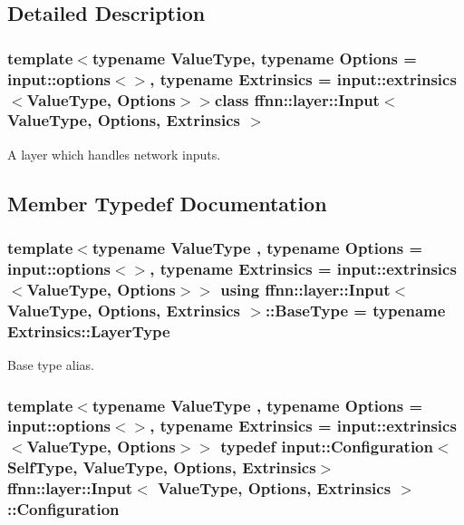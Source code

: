 \subsection{Detailed Description}
\subsubsection*{template$<$typename Value\-Type, typename Options = input\-::options$<$$>$, typename Extrinsics = input\-::extrinsics$<$\-Value\-Type, Options$>$$>$class ffnn\-::layer\-::\-Input$<$ Value\-Type, Options, Extrinsics $>$}

A layer which handles network inputs. 

\subsection{Member Typedef Documentation}
\hypertarget{classffnn_1_1layer_1_1_input_a260554aaf9a0bfddfc4a47b6acf0ecc0}{
\subsubsection[{Base\-Type}]{\setlength{\rightskip}{0pt plus 5cm}template$<$typename Value\-Type , typename Options  = input\-::options$<$$>$, typename Extrinsics  = input\-::extrinsics$<$\-Value\-Type, Options$>$$>$ using {\bf ffnn\-::layer\-::\-Input}$<$ Value\-Type, Options, Extrinsics $>$\-::{\bf Base\-Type} =  typename Extrinsics\-::\-Layer\-Type}}\label{classffnn_1_1layer_1_1_input_a260554aaf9a0bfddfc4a47b6acf0ecc0}


Base type alias. 

\hypertarget{classffnn_1_1layer_1_1_input_ae847a51afe587ae67d9cb1de579d15aa}{
\subsubsection[{Configuration}]{\setlength{\rightskip}{0pt plus 5cm}template$<$typename Value\-Type , typename Options  = input\-::options$<$$>$, typename Extrinsics  = input\-::extrinsics$<$\-Value\-Type, Options$>$$>$ typedef {\bf input\-::\-Configuration}$<${\bf Self\-Type}, Value\-Type, Options, Extrinsics$>$ {\bf ffnn\-::layer\-::\-Input}$<$ Value\-Type, Options, Extrinsics $>$\-::{\bf Configuration}}}\label{classffnn_1_1layer_1_1_input_ae847a51afe587ae67d9cb1de579d15aa}


